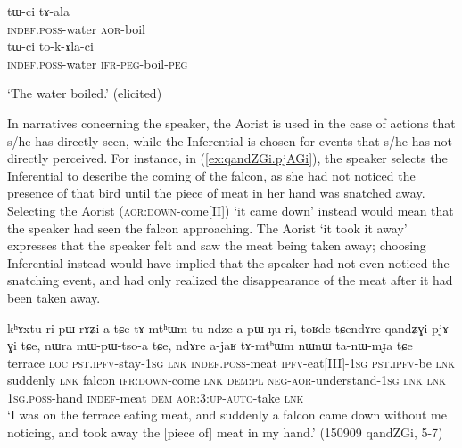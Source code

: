 \begin{exe}
\ex 
\begin{xlist}
\ex \label{ex:tWci.tala}
\gll tɯ-ci tɤ-ala \\
\textsc{indef}.\textsc{poss}-water \textsc{aor}-boil  \\
\ex \label{ex:tWci.tokAlaci}
\gll tɯ-ci to-k-ɤla-ci  \\
\textsc{indef}.\textsc{poss}-water \textsc{ifr}-\textsc{peg}-boil-\textsc{peg} \\
\end{xlist}
\glt `The water boiled.' (elicited)
\end{exe}

In narratives concerning the speaker, the Aorist is used in the case of actions that s/he has directly seen, while the Inferential is chosen for events that s/he has not directly perceived. For instance, in (\ref{ex:qandZGi.pjAGi}), the speaker selects the Inferential  to describe the coming of the falcon, as she had not noticed the presence of that bird until the piece of meat in her hand was snatched away. Selecting the Aorist  (\textsc{aor}:\textsc{down}-come[II]) `it came down' instead would mean that the speaker had seen the falcon approaching.  The Aorist  `it took it away' expresses that the speaker felt and saw the meat being taken away; choosing  Inferential  instead would have implied that the speaker had not even noticed the snatching event, and had only realized the disappearance of the meat after it had been taken away.


\begin{exe}
\ex \label{ex:qandZGi.pjAGi}
\gll   kʰɤxtu ri pɯ-rɤʑi-a tɕe tɤ-mtʰɯm tu-ndze-a pɯ-ŋu ri, toʁde tɕendɤre qandʑɣi pjɤ-ɣi tɕe, nɯra mɯ-pɯ-tso-a tɕe, ndɤre a-jaʁ tɤ-mtʰɯm nɯnɯ ta-nɯ-mɟa tɕe \\
terrace \textsc{loc} \textsc{pst}.\textsc{ipfv}-stay-\textsc{1sg} \textsc{lnk} \textsc{indef}.\textsc{poss}-meat \textsc{ipfv}-eat[III]-\textsc{1sg} \textsc{pst}.\textsc{ipfv}-be \textsc{lnk} suddenly \textsc{lnk} falcon \textsc{ifr}:\textsc{down}-come \textsc{lnk} \textsc{dem}:\textsc{pl} \textsc{neg}-\textsc{aor}-understand-\textsc{1sg} \textsc{lnk} \textsc{lnk} \textsc{1sg}.\textsc{poss}-hand \textsc{indef}-meat \textsc{dem} \textsc{aor}:3\flobv{}:\textsc{up}-\textsc{auto}-take \textsc{lnk} \\
\glt `I was on the terrace eating meat, and suddenly a falcon came down without me noticing, and took away the [piece of] meat in my hand.' (150909 qandZGi, 5-7)
 \end{exe}



